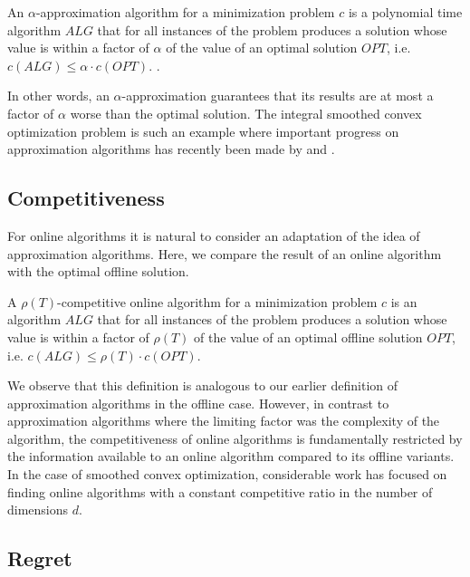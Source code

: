 \begin{definition}
An $\alpha$-approximation algorithm for a minimization problem $c$ is a polynomial time algorithm $ALG$ that for all instances of the problem produces a solution whose value is within a factor of $\alpha$ of the value of an optimal solution $OPT$, i.e. $c(ALG) \leq \alpha \cdot c(OPT)$. \cite{Williamson2011}.
\end{definition}

In other words, an $\alpha$-approximation guarantees that its results are at most a factor of $\alpha$ worse than the optimal solution. The integral smoothed convex optimization problem is such an example where important progress on approximation algorithms has recently been made by \citeauthor*{Kappelmann2017} and \citeauthor*{Albers2021_2} \cite{Kappelmann2017, Albers2021_2}.

\subsection{Competitiveness}

For online algorithms it is natural to consider an adaptation of the idea of approximation algorithms. Here, we compare the result of an online algorithm with the optimal offline solution.

\begin{definition}
A $\rho(T)$-competitive online algorithm for a minimization problem $c$ is an algorithm $ALG$ that for all instances of the problem produces a solution whose value is within a factor of $\rho(T)$ of the value of an optimal offline solution $OPT$, i.e. $c(ALG) \leq \rho(T) \cdot c(OPT)$.
\end{definition}

We observe that this definition is analogous to our earlier definition of approximation algorithms in the offline case. However, in contrast to approximation algorithms where the limiting factor was the complexity of the algorithm, the competitiveness of online algorithms is fundamentally restricted by the information available to an online algorithm compared to its offline variants. In the case of smoothed convex optimization, considerable work has focused on finding online algorithms with a constant competitive ratio in the number of dimensions $d$.

\subsection{Regret}

